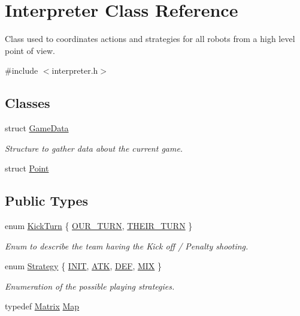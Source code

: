 \hypertarget{classInterpreter}{
\section{Interpreter Class Reference}
\label{classInterpreter}
}


Class used to coordinates actions and strategies for all robots from a high level point of view.  




{\ttfamily \#include $<$interpreter.h$>$}

\subsection*{Classes}
\begin{DoxyCompactItemize}
\item 
struct \hyperlink{structInterpreter_1_1GameData}{GameData}
\begin{DoxyCompactList}\small\item\em Structure to gather data about the current game. \item\end{DoxyCompactList}\item 
struct \hyperlink{structInterpreter_1_1Point}{Point}
\end{DoxyCompactItemize}
\subsection*{Public Types}
\begin{DoxyCompactItemize}
\item 
enum \hyperlink{classInterpreter_ac7c3ba77d973ffbb84b12db662cfe643}{KickTurn} \{ \hyperlink{classInterpreter_ac7c3ba77d973ffbb84b12db662cfe643a8c18a3c8b220a0c8166c1ee4b3504ebe}{OUR\_\-TURN}, 
\hyperlink{classInterpreter_ac7c3ba77d973ffbb84b12db662cfe643ac196847925fbe4bc38ee72b9b97d0f76}{THEIR\_\-TURN}
 \}
\begin{DoxyCompactList}\small\item\em Enum to describe the team having the Kick off / Penalty shooting. \item\end{DoxyCompactList}\item 
enum \hyperlink{classInterpreter_a0fb49436c8c14ca79e13f1cd78119088}{Strategy} \{ \hyperlink{classInterpreter_a0fb49436c8c14ca79e13f1cd78119088af1c3928f408be0d85ce73e1686e519d9}{INIT}, 
\hyperlink{classInterpreter_a0fb49436c8c14ca79e13f1cd78119088a8bf993c8b673e31f609171552d65c4c4}{ATK}, 
\hyperlink{classInterpreter_a0fb49436c8c14ca79e13f1cd78119088ae58df17fd988314c295b980f6a5a6a75}{DEF}, 
\hyperlink{classInterpreter_a0fb49436c8c14ca79e13f1cd78119088a5509091a7f3746995da83c92dd449187}{MIX}
 \}
\begin{DoxyCompactList}\small\item\em Enumeration of the possible playing strategies. \item\end{DoxyCompactList}\item 
typedef \hyperlink{classMatrix}{Matrix} \hyperlink{classInterpreter_a4c080f069f557cf92dfe803117a6ea53}{Map}
\end{DoxyCompactItemize}
